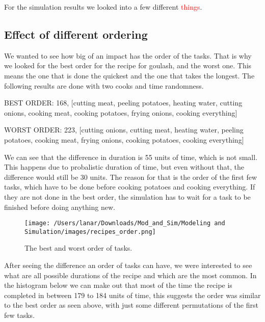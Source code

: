For the simulation results we looked into a few different \textcolor{red}{things}.

\subsection{Effect of different ordering}
We wanted to see how big of an impact has the order of the tasks. That is why we looked for the best order for the recipe for goulash, and the worst one. This means the one that is done the quickest and the one that takes the longest.
The following results are done with two cooks and time randomness.

\begin{verbnobox}[\fontsize{10pt}{10pt}\selectfont]
BEST ORDER: 168, 
[cutting meat, peeling potatoes, heating water, cutting onions, cooking meat, 
cooking potatoes, frying onions, cooking everything]
\end{verbnobox}

\begin{verbnobox}[\fontsize{10pt}{10pt}\selectfont]
WORST ORDER: 223,
[cutting onions, cutting meat, heating water, peeling potatoes, cooking meat,
 frying onions, cooking potatoes, cooking everything]
\end{verbnobox}

We can see that the difference in duration is 55 units of time, which is not small. 
This happens due to probalistic duration of time, but even without that, the difference would still be 30 units. The reason for that is the order of the first few tasks, 
which have to be done before cooking potatoes and cooking everything. If they are not done in the best order, the simulation has to wait for a task to be finished before doing anything new. 

\begin{figure}[H]
    \centerline{\texttt{[image: /Users/lanar/Downloads/Mod\_and\_Sim/Modeling and Simulation/images/recipes\_order.png]}}
    \caption{The best and worst order of tasks.}
    \label{fig3}
\end{figure}

After seeing the difference an order of tasks can have, we were interested to see what are all possible durations of the recipe and which are the most common. 
In the histogram below we can make out that most of the time the recipe is completed in between 179 to 184 units of time, this suggests the order was similar to the best order as seen above, with just some different permutations of the first few tasks.


